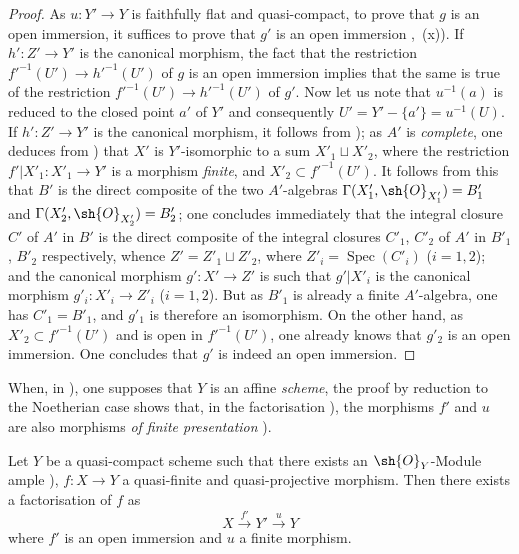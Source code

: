 \begin{proof}
As $u:Y'\to Y$ is faithfully flat and quasi-compact, to prove that $g$ is an open immersion, it suffices to prove that $g'$ is an open immersion ,~(x)).
If $h':Z'\to Y'$ is the canonical morphism, the fact that the restriction $f'^{-1}(U')\to h'^{-1}(U')$ of $g$ is an open immersion implies that the same is true of the restriction $f'^{-1}(U')\to h'^{-1}(U')$ of $g'$.
Now let us note that $u^{-1}(a)$ is reduced to the closed point $a'$ of $Y'$ and consequently $U'=Y'-\{a'\}=u^{-1}(U)$.
If $h':Z'\to Y'$ is the canonical morphism, it follows from ); as $A'$ is \emph{complete}, one deduces from ) that $X'$ is $Y'$-isomorphic to a sum $X'_1\sqcup X'_2$, where the restriction $f'|X'_1:X'_1\to Y'$ is a morphism \emph{finite}, and $X'_2\subset f'^{-1}(U')$.
It follows from this that $B'$ is the direct composite of the two $A'$-algebras $\Gamma(X'_1,\sh{O}_{X'_1})=B'_1$ and $\Gamma(X'_2,\sh{O}_{X'_2})=B'_2$; one concludes immediately that the integral closure $C'$ of $A'$ in $B'$ is the direct composite of the integral closures $C'_1$, $C'_2$ of $A'$ in $B'_1$, $B'_2$ respectively, whence $Z'=Z'_1\sqcup Z'_2$, where $Z'_i=\operatorname{Spec}(C'_i)$ ($i=1,2$); and the canonical morphism $g':X'\to Z'$ is such that $g'|X'_i$ is the canonical morphism $g'_i:X'_i\to Z'_i$ ($i=1,2$).
But as $B'_1$ is already a finite $A'$-algebra, one has $C'_1=B'_1$, and $g'_1$ is therefore an isomorphism.
On the other hand, as $X'_2\subset f'^{-1}(U')$ and is open in $f'^{-1}(U')$, one
already knows that $g'_2$ is an open immersion.
One concludes that $g'$ is indeed an open immersion.
\end{proof}

\begin{remark}[8.12.7]
\label{IV.8.12.7}
When, in ), one supposes that $Y$ is an affine \emph{scheme}, the proof by reduction to the Noetherian case shows that, in the factorisation ), the morphisms $f'$ and $u$ are also morphisms \emph{of finite presentation} ).
\end{remark}

\begin{corollary}[8.12.8]
\label{IV.8.12.8}
Let $Y$ be a quasi-compact scheme such that there exists an $\sh{O}_Y$-Module ample ), $f:X\to Y$ a quasi-finite and quasi-projective morphism.
Then there exists a factorisation of $f$ as
\[
X\xrightarrow{f'}Y'\xrightarrow{u}Y
\]
where $f'$ is an open immersion and $u$ a finite morphism.
\end{corollary}

